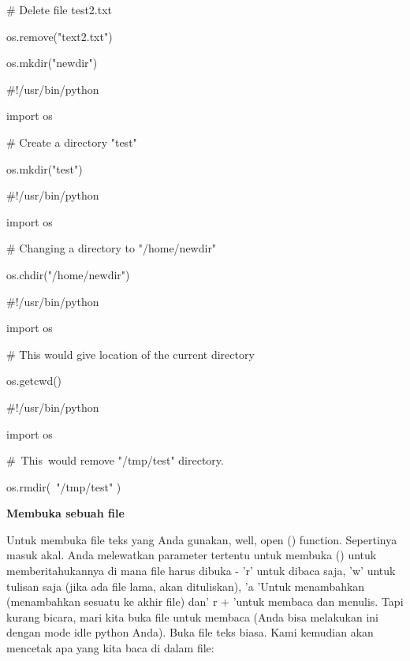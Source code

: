 \noindent 
 $  \#  $ Delete file test2.txt \par
\noindent 
os.remove("text2.txt") \par
\vspace{12pt}
\noindent 
os.mkdir("newdir") \par
\vspace{12pt}
\noindent 
 $  \#  $!/usr/bin/python \par
\noindent 
import os \par
\vspace{12pt}
\noindent 
 $  \#  $ Create a directory "test" \par
\noindent 
os.mkdir("test") \par
\vspace{12pt}
\noindent 
 $  \#  $!/usr/bin/python \par
\noindent 
import os \par
\vspace{12pt}
\noindent 
 $  \#  $ Changing a directory to "/home/newdir" \par
\noindent 
os.chdir("/home/newdir") \par
\vspace{12pt}
\noindent 
 $  \#  $!/usr/bin/python \par
\noindent 
import os \par
\vspace{12pt}
\noindent 
 $  \#  $ This would give location of the current directory \par
\noindent 
os.getcwd() \par
\vspace{12pt}
\noindent 
 $  \#  $!/usr/bin/python \par
\noindent 
import os \par
\vspace{12pt}
\noindent 
 $  \#  $~This~would  remove "/tmp/test"  directory. \par
\noindent 
os.rmdir(~"/tmp/test"  ) \par
\vspace{12pt}
\vspace{12pt}
\noindent 
{\fontsize{14pt}{14pt}\selectfont \textbf{Membuka sebuah file} \\} \par
\vspace{12pt}
Untuk membuka file teks yang Anda gunakan, well, open () function. Sepertinya masuk akal. Anda melewatkan parameter tertentu untuk membuka () untuk memberitahukannya di mana file harus dibuka - 'r' untuk dibaca saja, 'w' untuk tulisan saja (jika ada file lama, akan dituliskan), 'a 'Untuk menambahkan (menambahkan sesuatu ke akhir file) dan' r + 'untuk membaca dan menulis. Tapi kurang bicara, mari kita buka file untuk membaca (Anda bisa melakukan ini dengan mode idle python Anda). Buka file teks biasa. Kami kemudian akan mencetak apa yang kita baca di dalam file: \par
